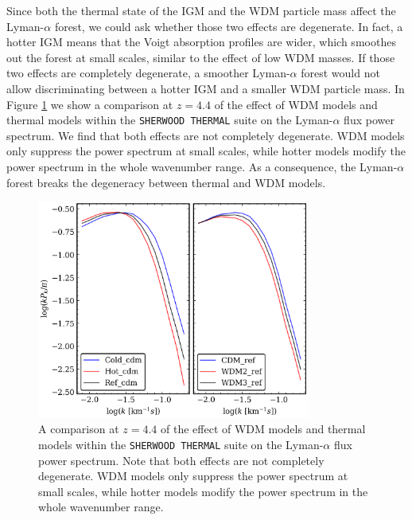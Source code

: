 Since both the thermal state of the IGM and the WDM particle mass affect the Lyman-$\alpha$ forest, we could ask whether those two effects are degenerate. In fact, a hotter IGM means that the Voigt absorption profiles are wider, which smoothes out the forest at small scales, similar to the effect of low WDM masses. If those two effects are completely degenerate, a smoother Lyman-$\alpha$ forest would not allow discriminating between a hotter IGM and a smaller WDM particle mass. In Figure \ref{fig: PS thermal vs WDM} we show a comparison at $z=4.4$ of the effect of WDM models and thermal models within the \texttt{SHERWOOD THERMAL} suite on the Lyman-$\alpha$ flux power spectrum. We find that both effects are not completely degenerate. WDM models only suppress the power spectrum at small scales, while hotter models modify the power spectrum in the whole wavenumber range. As a consequence, the Lyman-$\alpha$ forest breaks the degeneracy between thermal and WDM models.

\begin{figure}[ht]
        \centering
            \includegraphics[width=0.8\textwidth]{img/ML/PS_thermal_vs_wdm.png}
            \caption{A comparison at $z=4.4$ of the effect of WDM models and thermal models within the \texttt{SHERWOOD THERMAL} suite on the Lyman-$\alpha$ flux power spectrum. Note that both effects are not completely degenerate. WDM models only suppress the power spectrum at small scales, while hotter models modify the power spectrum in the whole wavenumber range.}
            \label{fig: PS thermal vs WDM}
\end{figure}   




